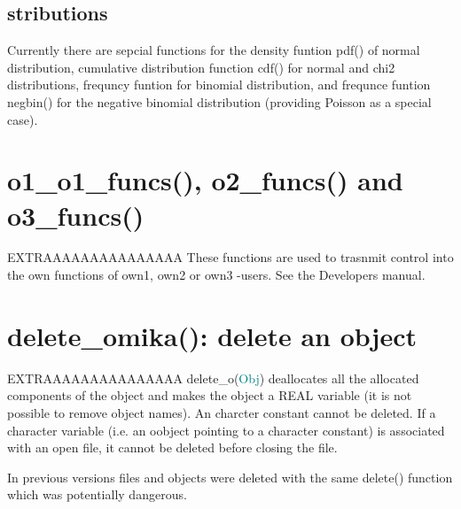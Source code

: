 \subsection{stributions}
\label{distributions}
Currently there are sepcial functions for the density funtion \textcolor{VioletRed}{pdf}() of normal distribution,
cumulative distribution function \textcolor{VioletRed}{cdf}() for normal and chi2 distributions,
frequncy funtion for binomial distribution, and frequnce funtion \textcolor{VioletRed}{negbin}() for the
negative binomial distribution (providing Poisson as a special case).
\section*{o1\_o1\_funcs(), o2\_funcs() and o3\_funcs()}
EXTRAAAAAAAAAAAAAAA
These functions are used to trasnmit control into the own functions of
own1, own2 or own3 -users. See the Developers manual.
\section*{delete\_omika(): delete an object}
EXTRAAAAAAAAAAAAAAA
delete\_o(\textcolor{teal}{Obj}) deallocates all the allocated components of the object and
makes the object a REAL variable (it is not possible to remove object names).
An charcter constant cannot be deleted. If a character variable (i.e. an oobject pointing
to a character constant) is associated with an open file, it cannot be
deleted before closing the file.
\begin{note}
In previous versions files and objects were deleted with the same delete() function
which was potentially dangerous.
\end{note}
